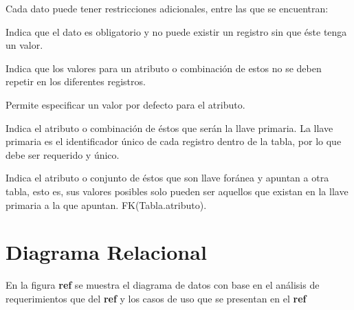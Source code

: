 Cada dato puede tener restricciones adicionales, entre las que se encuentran:
    
    \begin{bGlosario}
    
            Indica que el dato es obligatorio y no puede existir un registro sin que éste tenga
            un valor.
            
            Indica que los valores para un atributo o combinación de estos no se deben
            repetir en los diferentes registros.
            
            Permite especificar un valor por defecto para el atributo.
            
            Indica el atributo o combinación de éstos que serán la llave primaria. La llave
            primaria es el identificador único de cada registro dentro de la tabla, por lo
            que debe ser requerido y único.
            
            Indica el atributo o conjunto de éstos que son llave foránea y apuntan a otra
            tabla, esto es, sus valores posibles solo pueden ser aquellos que existan en la
            llave primaria a la que apuntan. FK(Tabla.atributo).

            
    \end{bGlosario}
    

\section{Diagrama Relacional}

En la figura \textbf{ref} se muestra el diagrama de datos con base en el análisis de requerimientos que
del \textbf{ref} y los  casos de uso que se presentan en el \textbf{ref}
%            
%    


